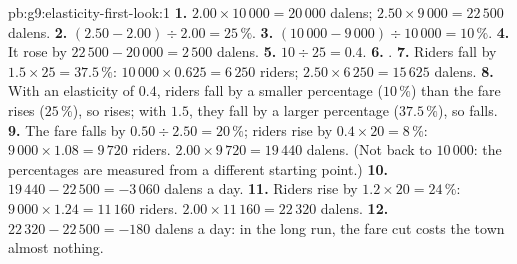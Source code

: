 \begin{solution}{pb:g9:elasticity-first-look:1}
\textbf{1.} $2.00 \times 10\,000 = 20\,000$ dalens; $2.50 \times 9\,000 = 22\,500$ dalens.
\textbf{2.} $(2.50 - 2.00) \div 2.00 = 25\,\%$.
\textbf{3.} $(10\,000 - 9\,000) \div 10\,000 = 10\,\%$.
\textbf{4.} It rose by $22\,500 - 20\,000 = 2\,500$ dalens.
\textbf{5.} $10 \div 25 = 0.4$.
\textbf{6.} .
\textbf{7.} Riders fall by $1.5 \times 25 = 37.5\,\%$: $10\,000 \times 0.625 = 6\,250$ riders;  $2.50
\times 6\,250 = 15\,625$ dalens.
\textbf{8.} With an elasticity of $0.4$, riders fall by a smaller percentage ($10\,\%$) than the fare rises
($25\,\%$), so  rises; with $1.5$, they fall by a larger percentage ($37.5\,\%$), so  falls.
\textbf{9.} The fare falls by $0.50 \div 2.50 = 20\,\%$; riders rise by $0.4 \times 20 = 8\,\%$: $9\,000 \times
1.08 = 9\,720$ riders.  $2.00 \times 9\,720 = 19\,440$ dalens. (Not back to $10\,000$: the
percentages are measured from a different starting point.)
\textbf{10.} $19\,440 - 22\,500 = -3\,060$ dalens a day.
\textbf{11.} Riders rise by $1.2 \times 20 = 24\,\%$: $9\,000 \times 1.24 = 11\,160$ riders.  $2.00
\times 11\,160 = 22\,320$ dalens.
\textbf{12.} $22\,320 - 22\,500 = -180$ dalens a day: in the long run, the fare cut costs the town almost
nothing.
\end{solution}
